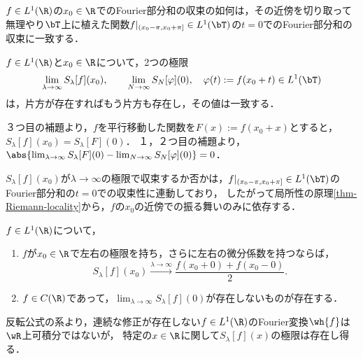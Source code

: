 \documentclass[uplatex,dvipdfmx]{jsreport}
\begin{document}
\begin{tcolorbox}[colframe=ForestGreen, colback=ForestGreen!10!white,breakable,colbacktitle=ForestGreen!40!white,coltitle=black,fonttitle=\bfseries\sffamily,
title=局所的に周期関数で近似すればそこでのFourier級数の収束先に一致する]
    $f\in L^1(\R)$の$x_0\in\R$でのFourier部分和の収束の如何は，その近傍を切り取って無理やり$\bT$上に植えた関数$f|_{(x_0-\pi,x_0+\pi]}\in L^1(\bT)$の$t=0$でのFourier部分和の収束に一致する．
\end{tcolorbox}

\begin{theorem}[$\R$上の局所性原理]
    $f\in L^1(\R)$と$x_0\in\R$について，2つの極限
    \[\lim_{\lambda\to\infty}S_\lambda[f](x_0),\qquad\lim_{N\to\infty}S_N[\varphi](0),\quad\varphi(t):=f(x_0+t)\in L^1(\bT)\]
    は，片方が存在すればもう片方も存在し，その値は一致する．
\end{theorem}
\begin{Proof}
    ３つ目の補題より，$f$を平行移動した関数を$F(x):=f(x_0+x)$とすると，$S_\lambda[f](x_0)=S_\lambda[F](0)$．
    １，２つ目の補題より，$\abs{\lim_{\lambda\to\infty}S_\lambda[F](0)-\lim_{N\to\infty}S_N[\varphi](0)}=0$．
\end{Proof}
\begin{remarks}[Riemannの局所性原理の引き戻し]
    $S_\lambda[f](x_0)$が$\lambda\to\infty$の極限で収束するか否かは，$f|_{(x_0-\pi,x_0+\pi]}\in L^1(\bT)$のFourier部分和の$t=0$での収束性に連動しており，
    したがって局所性の原理\ref{thm-Riemann-locality}から，$f$の$x_0$の近傍での振る舞いのみに依存する．
\end{remarks}

\begin{corollary}
    $f\in L^1(\R)$について，
    \begin{enumerate}
        \item $f$が$x_0\in\R$で左右の極限を持ち，さらに左右の微分係数を持つならば，
        \[S_\lambda[f](x_0)\xrightarrow{\lambda\to\infty}\frac{f(x_0+0)+f(x_0-0)}{2}.\]
        \item $f\in C(\R)$であって，$\lim_{\lambda\to\infty}S_\lambda[f](0)$が存在しないものが存在する．
    \end{enumerate}
\end{corollary}
\begin{remark}
    反転公式の系より，連続な修正が存在しない$f\in L^1(\R)$のFourier変換$\wh{f}$は$\wR$上可積分ではないが，
    特定の$x\in\R$に関して$S_\lambda[f](x)$の極限は存在し得る．
\end{remark}
\end{document}
